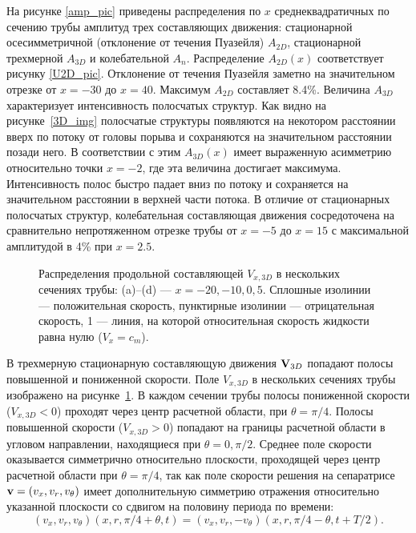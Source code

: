 На рисунке \ref{amp_pic} приведены распределения по $x$ среднеквадратичных по сечению трубы амплитуд трех составляющих движения: стационарной осесимметричной (отклонение от течения Пуазейля) $A_{2D}$, стационарной трехмерной $A_{3D}$ и колебательной $A_n$. Распределение $A_{2D}(x)$ соответствует рисунку \ref{U2D_pic}. Отклонение от течения Пуазейля заметно на значительном отрезке от $x=-30$ до $x=40$. Максимум $A_{2D}$ составляет 8.4\%. Величина $A_{3D}$ характеризует интенсивность полосчатых структур. Как видно на рисунке~\ref{3D_img} полосчатые структуры появляются на некотором расстоянии вверх по потоку от головы порыва и сохраняются на значительном расстоянии позади него. В соответствии с этим $A_{3D}(x)$ имеет выраженную асимметрию относительно точки $x=-2$, где эта величина достигает максимума. Интенсивность полос быстро падает вниз по потоку и сохраняется на значительном расстоянии в верхней части потока. В отличие от стационарных полосчатых структур, колебательная составляющая движения сосредоточена на сравнительно непротяженном отрезке трубы от $x=-5$ до $x=15$ с максимальной амплитудой в 4\% при $x=2.5$.


\begin{figure}[h]
\caption{Распределения продольной составляющей $V_{x,3D}$ в нескольких сечениях трубы: (a)--(d) --- $x = -20, -10, 0, 5$. Сплошные изолинии --- положительная скорость, пунктирные изолинии --- отрицательная скорость, 1 --- линия, на которой относительная скорость жидкости равна нулю ($V_{x} = c_m$).}
\label{V3D_cs_pic}
\end{figure}


В трехмерную стационарную составляющую движения $\mathbf{V}_{3D}$ попадают полосы повышенной и пониженной скорости. Поле $V_{x,3D}$ в нескольких сечениях трубы изображено на рисунке~\ref{V3D_cs_pic}. В каждом сечении трубы полосы пониженной скорости ($V_{x,3D} < 0$) проходят через центр расчетной области, при $\theta = \pi/4$. Полосы повышенной скорости ($V_{x,3D} > 0$) попадают на границы расчетной области в угловом направлении, находящиеся при $\theta = 0, \pi/2$. Среднее поле скорости оказывается симметрично относительно плоскости, проходящей через центр расчетной области при $\theta = \pi/4$, так как поле скорости решения на сепаратрисе $\mathbf{v} = (v_x, v_r, v_\theta)$ имеет дополнительную симметрию отражения относительно указанной плоскости со сдвигом на половину периода по времени:
\begin{equation}
(v_x, v_r, v_\theta)(x, r, \pi/4 + \theta, t) = (v_x, v_r, -v_\theta)(x, r, \pi/4 - \theta, t + T/2). 
\end{equation} 


